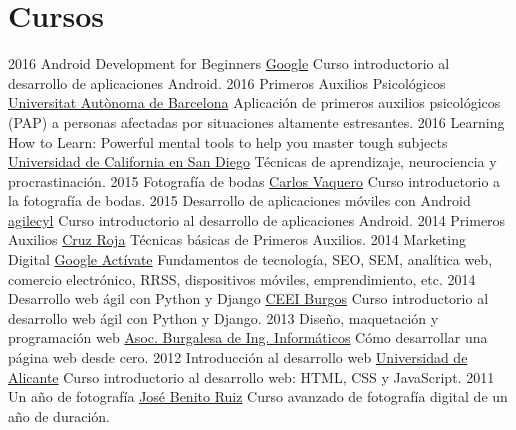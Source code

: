 \documentclass[]{friggeri-cv}
\begin{document}
\section{Cursos}
\begin{entrylist}
  \entry
    {2016}
    {Android Development for Beginners}
    {\href{https://www.udacity.com/course/android-development-for-beginners--ud837}{Google}}
    {Curso introductorio al desarrollo de aplicaciones Android.}
  \entry
    {2016}
    {Primeros Auxilios Psicológicos}
    {\href{https://www.coursera.org/learn/pap}{Universitat Autònoma de Barcelona}}
    {Aplicación de primeros auxilios psicológicos (PAP) a personas afectadas por situaciones altamente estresantes.}
  \entry
    {2016}
    {Learning How to Learn: Powerful mental tools to help you master tough subjects}
    {\href{https://coursera.org/learn/learning-how-to-learn/}{Universidad de California en San Diego}}
    {Técnicas de aprendizaje, neurociencia y procrastinación.}
  \entry
    {2015}
    {Fotografía de bodas}
    {\href{http://www.carlosvaquero.es/}{Carlos Vaquero}}
    {Curso introductorio a la fotografía de bodas.}
  \entry
    {2015}
    {Desarrollo de aplicaciones móviles con Android}
    {\href{http://agilecyl.org/}{agilecyl}}
    {Curso introductorio al desarrollo de aplicaciones Android.}
  \entry
    {2014}
    {Primeros Auxilios}
    {\href{http://www.cruzroja.es/}{Cruz Roja}}
    {Técnicas básicas de Primeros Auxilios.}
  \entry
    {2014}
    {Marketing Digital}
    {\href{https://www.google.es/landing/activate/}{Google Actívate}} 
    {Fundamentos de tecnología, SEO, SEM, analítica web, comercio electrónico, RRSS, dispositivos móviles, emprendimiento, etc.}
  \entry
    {2014}
    {Desarrollo web ágil con Python y Django}
    {\href{http://www.ceeiburgos.es/}{CEEI Burgos}} 
    {Curso introductorio al desarrollo web ágil con Python y Django.}    
  \entry
    {2013}
    {Diseño, maquetación y programación web}
    {\href{http://abi2burgos.es/}{Asoc. Burgalesa de Ing. Informáticos}}   
    {Cómo desarrollar una página web desde cero.}     
  \entry
    {2012}
    {Introducción al desarrollo web}
    {\href{https://www.ua.es/}{Universidad de Alicante}}  
    {Curso introductorio al desarrollo web: HTML, CSS y JavaScript.}     
  \entry
    {2011}
    {Un año de fotografía}
    {\href{http://josebruiz.com/}{José Benito Ruiz}}    
    {Curso avanzado de fotografía digital de un año de duración.}      
\end{entrylist}
\end{document}
